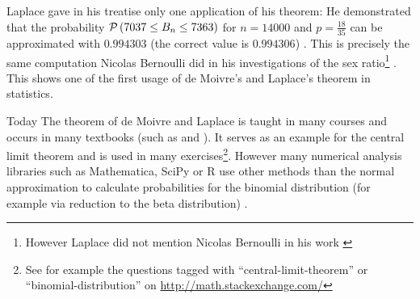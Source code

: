 Laplace gave in his treatise only one application of his theorem: He demonstrated that the probability $\mathcal P\left({7037 \le B_{n} \le 7363}\right)$ for $n=14000$ and $p=\frac{18}{35}$ can be approximated with $0.994303$ (the correct value is $0.994306$) \cite[.497]{hald1}\cite[p. 25]{hald2}. This is precisely the same computation Nicolas Bernoulli did in his investigations of the sex ratio\footnote{However Laplace did not mention Nicolas Bernoulli in his work \cite[p. 25]{hald2}} \cite[p. 25]{hald2}. This shows one of the first usage of de Moivre's and Laplace's theorem in statistics.

Today The theorem of de Moivre and Laplace is taught in many courses and occurs in many textbooks (such as \cite[pp. 64-67]{irle} and \cite[pp. 131-134]{georgii}). It serves as an example for the central limit theorem and is used in many exercises\footnote{See for example the questions tagged with ``central-limit-theorem'' or ``binomial-distribution'' on \url{http://math.stackexchange.com/}}. However many numerical analysis libraries such as Mathematica, SciPy or R use other methods than the normal approximation to calculate probabilities for the binomial distribution (for example via reduction to the beta distribution) \cite{mathematica}\cite{scipy}\cite{r}.
